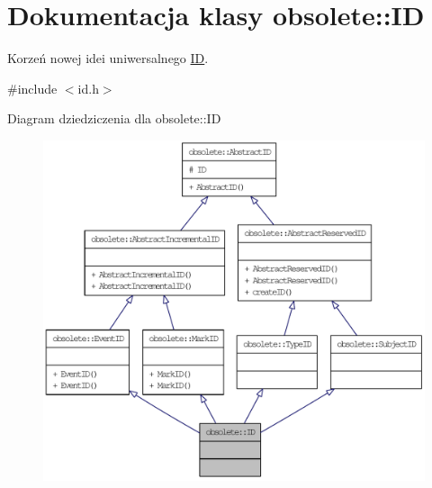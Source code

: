 \hypertarget{classobsolete_1_1ID}{
\section{Dokumentacja klasy obsolete::ID}
\label{classobsolete_1_1ID}
}


Korzeń nowej idei uniwersalnego \hyperlink{classobsolete_1_1ID}{ID}.  




{\ttfamily \#include $<$id.h$>$}



Diagram dziedziczenia dla obsolete::ID\nopagebreak
\begin{figure}[H]
\begin{center}
\leavevmode
\includegraphics[width=400pt]{classobsolete_1_1ID__inherit__graph}
\end{center}
\end{figure}



